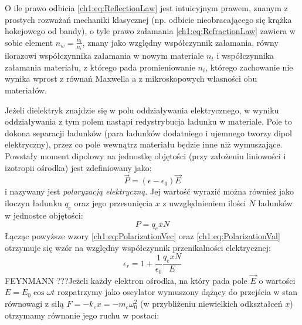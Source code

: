 O ile prawo odbicia \eqref{ch1:eq:ReflectionLaw} jest intuicyjnym prawem, znanym z prostych rozważań mechaniki klasycznej (np. odbicie nieobracającego się krążka hokejowego od bandy), o tyle prawo załamania \eqref{ch1:eq:RefractionLaw} zawiera w sobie element $n_w = \frac{n_t}{n_i}$, znany jako względny współczynnik załamania, równy ilorazowi współczynnika załamania w nowym materiale $n_t$ i współczynnika załamania materiału, z którego pada promieniowanie $n_i$, którego zachowanie nie wynika wprost z równań Maxwella a z mikroskopowych własności obu materiałów. 

Jeżeli dielektryk znajdzie się w polu oddziaływania elektrycznego, w wyniku oddziaływania z tym polem nastąpi redystrybucja ładunku w materiale. Pole to dokona separacji ładunków (para ładunków dodatniego i ujemnego tworzy dipol elektryczny), przez co pole wewnątrz materiału będzie inne niż wymuszające. Powstały moment dipolowy na jednostkę objętości (przy założeniu liniowości i izotropii ośrodka) jest zdefiniowany jako:
\begin{equation}
\vec{P} = (\epsilon - \epsilon_0)\vec{E}
\label{ch1:eq:PolarizationVec}
\end{equation}
i nazywany jest \textit{polaryzacją elektryczną}. Jej wartość wyrazić można również jako iloczyn ładunku $q_e$ oraz jego przesunięcia $x$ z uwzględnieniem ilości $N$ ładunków w jednostce objętości:
\begin{equation}
P = q_exN
\label{ch1:eq:PolarizationVal}
\end{equation}
Łącząc powyższe wzory \eqref{ch1:eq:PolarizationVec} oraz \eqref{ch1:eq:PolarizationVal} otrzymuje się wzór na względny współczynnik przenikalności elektrycznej:
\begin{equation}
\epsilon_r = 1 + \frac{1}{\epsilon_0}\frac{q_exN}{E}
\label{ch1:eq:RelativeEpsilon}
\end{equation}
{\color{red}FEYNMANN ???}Jeżeli każdy elektron ośrodka, na który pada pole $\vec{E}$ o wartości $E = E_0\cos\omega t$ rozpatrzymy jako oscylator wymuszony dążący do przejścia w stan równowagi z siłą $F = -k_ex = -m_e\omega_0^2$ (w przybliżeniu niewielkich odkształceń $x$) otrzymamy równanie jego ruchu w postaci:

